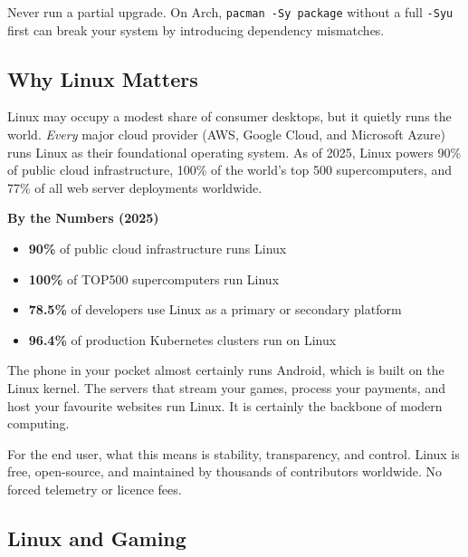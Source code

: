 \documentclass{article}
\newcommand{\code}[1]{\colorbox{codebg}{\texttt{#1}}}
\begin{document}
\begin{tcolorbox}[arc=12pt, outer arc=10pt, colback=red!5!white, colframe=red!60!black, title=\textbf{Warning}]
Never run a partial upgrade. On Arch, \code{pacman -Sy package} without a full \code{-Syu} first can break your system by introducing dependency mismatches.
\end{tcolorbox}

\subsection{Why Linux Matters}

Linux may occupy a modest share of consumer desktops, but it quietly runs the world. \textit{Every} major cloud provider (AWS, Google Cloud, and Microsoft Azure) runs
Linux as their foundational operating system. As of 2025, Linux powers 90\% of public cloud infrastructure, 100\% of the world's top 500 supercomputers, and 77\% of all web server deployments worldwide.

\begin{callout}{\textbf{By the Numbers (2025)}}
  \begin{itemize}[nosep, leftmargin=1.2em, label={\tiny\textbullet}]
    \item \textbf{90\%} of public cloud infrastructure runs Linux
    \item \textbf{100\%} of TOP500 supercomputers run Linux
    \item \textbf{78.5\%} of developers use Linux as a primary or secondary platform
    \item \textbf{96.4\%} of production Kubernetes clusters run on Linux
  \end{itemize}
\end{callout}

\noindent The phone in your pocket almost certainly runs Android, which is built on the Linux kernel. The servers that stream your games, process your payments, and host
your favourite websites run Linux. It is certainly the backbone of modern computing.

For the end user, what this means is stability, transparency, and control. Linux is free, open-source, and maintained by thousands of contributors worldwide. No forced telemetry or licence fees.

\subsection{Linux and Gaming}
\end{document}
